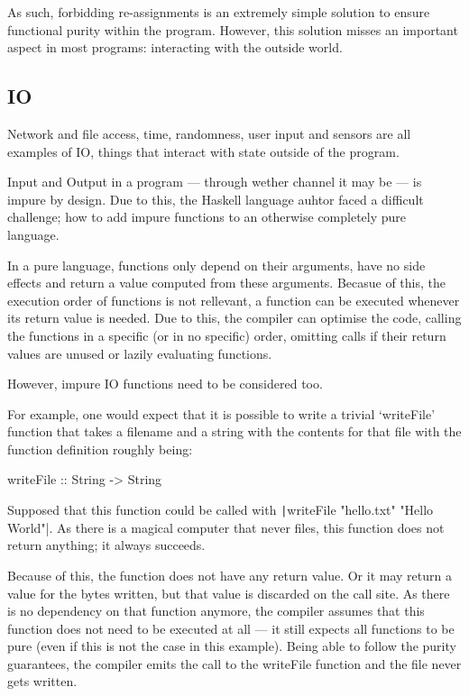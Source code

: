 As such, forbidding re-assignments is an extremely simple solution to
ensure functional purity within the program. However, this solution misses
an important aspect in most programs: interacting with the outside world.

\subsection{IO}
Network and file access, time, randomness, user input and sensors are all examples
of IO, things that interact with state outside of the program.

Input and Output in a program --- through wether channel it may be --- is
impure by design. Due to this, the Haskell language auhtor faced a difficult
challenge; how to add impure functions to an otherwise completely pure
language.

In a pure language, functions only depend on their arguments, have
no side effects and return a value computed from these arguments. Becasue
of this, the execution order of functions is not rellevant, a function
can be executed whenever its return value is needed.
Due to this, the compiler can optimise the code, calling the functions
in a specific (or in no specific) order, omitting calls if their return
values are unused or lazily evaluating functions.

However, impure IO functions need to be considered too.

For example, one would expect that it is possible to write a trivial `writeFile'
function that takes a filename and a string with the contents for that file with
the function definition roughly being:

\begin{haskellcode}
writeFile :: String -> String
\end{haskellcode}
Supposed that this function could be called with
\texttt|writeFile "hello.txt" "Hello World"|. As there is a magical
computer that never files, this function does not return anything; it always succeeds.

Because of this, the function does not have any return value. Or it may return a
value for the bytes written, but that value is discarded on the call site.
As there is no dependency on that function anymore, the compiler assumes that
this function does not need to be executed at all --- it still expects all
functions to be pure (even if this is not the case in this example).
Being able to follow the purity guarantees, the compiler emits the call
to the writeFile function and the file never gets written.


